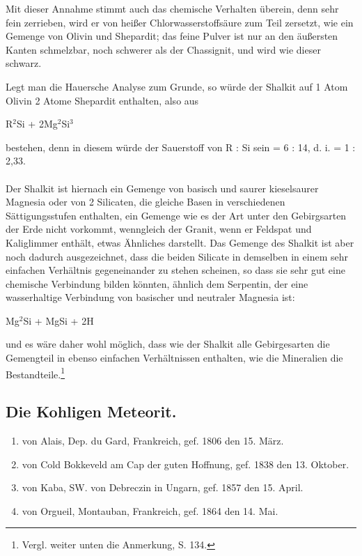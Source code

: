 \documentclass[a4paper, 11pt, oneside]{article}
\begin{document}
Mit dieser Annahme stimmt auch das chemische Verhalten überein, denn sehr fein zerrieben, wird er von heißer Chlorwasserstoffsäure zum Teil zersetzt, wie ein Gemenge von Olivin und Shepardit; das feine Pulver ist nur an den äußersten Kanten schmelzbar, noch schwerer als der Chassignit, und wird wie dieser schwarz.

Legt man die Hauersche Analyse zum Grunde, so würde der Shalkit auf 1 Atom Olivin 2 Atome Shepardit enthalten, also aus
\begin{center}
R$^{2}$Si + 2Mg$^{2}$Si$^{3}$
\end{center}
bestehen, denn in diesem würde der Sauerstoff von R : Si sein = 6 : 14, d. i. = 1 : 2,33.
\paragraph{}
Der Shalkit ist hiernach ein Gemenge von basisch und saurer kieselsaurer Magnesia oder von 2 Silicaten, die gleiche Basen in verschiedenen Sättigungsstufen enthalten, ein Gemenge wie es der Art unter den Gebirgsarten der Erde nicht vorkommt, wenngleich der Granit, wenn er Feldspat und Kaliglimmer enthält, etwas Ähnliches darstellt. Das Gemenge des Shalkit ist aber noch dadurch ausgezeichnet, dass die beiden Silicate in demselben in einem sehr einfachen Verhältnis gegeneinander zu stehen scheinen, so dass sie sehr gut eine chemische Verbindung bilden könnten, ähnlich dem Serpentin, der eine wasserhaltige Verbindung von basischer und neutraler Magnesia ist:
\begin{center}
Mg$^{2}$Si + MgSi + 2H
\end{center}
und es wäre daher wohl möglich, dass wie der Shalkit alle Gebirgesarten die Gemengteil in ebenso einfachen Verhältnissen enthalten, wie die Mineralien die Bestandteile.\footnote{Vergl. weiter unten die Anmerkung, S. 134.}
\subsection{Die Kohligen Meteorit.}
\begin{enumerate}
    \item von Alais, Dep. du Gard, Frankreich, gef. 1806 den 15. März.
    \item von Cold Bokkeveld am Cap der guten Hoffnung, gef. 1838 den 13. Oktober.
    \item von Kaba, SW. von Debreczin in Ungarn, gef. 1857 den 15. April.
    \item von Orgueil, Montauban, Frankreich, gef. 1864 den 14. Mai.
\end{enumerate}
\end{document}
